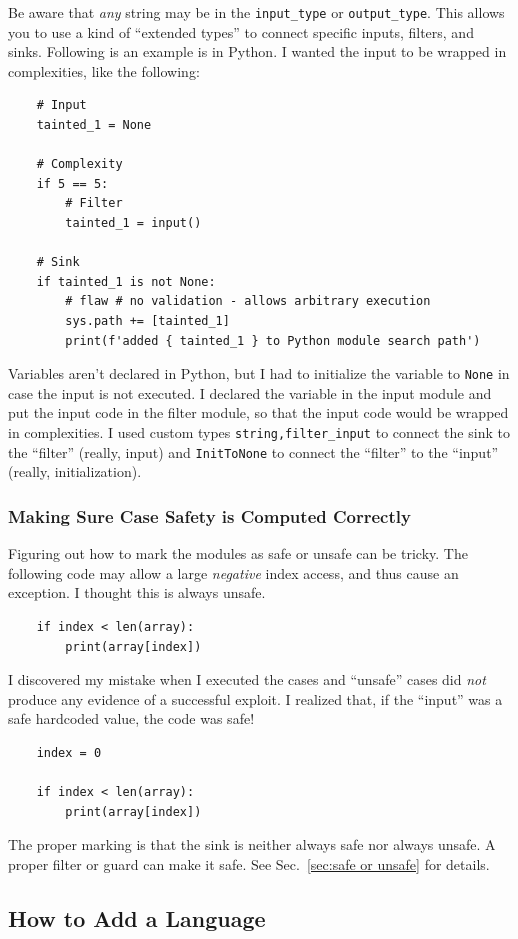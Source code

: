 \documentclass[12pt]{article}
\begin{document}
Be aware that \emph{any} string may be in the \verb|input_type| or
\verb|output_type|.
This allows you to use a kind of ``extended types'' to connect specific inputs,
filters, and sinks.  Following is an example is in Python.
I wanted the input to be wrapped in
complexities, like the following:
\begin{verbatim}
    # Input
    tainted_1 = None

    # Complexity
    if 5 == 5:
        # Filter
        tainted_1 = input()

    # Sink
    if tainted_1 is not None:
        # flaw # no validation - allows arbitrary execution
        sys.path += [tainted_1]
        print(f'added { tainted_1 } to Python module search path')
\end{verbatim}
Variables aren't declared in Python, but I had to initialize the variable to
\verb|None| in case the input is not executed.  I declared the variable in the input
module and put the input code in the filter module, so that the input code would be
wrapped in complexities.  I used custom types \verb|string,filter_input| to connect
the sink to the ``filter'' (really, input) and \verb|InitToNone| to connect the
``filter'' to the ``input'' (really, initialization).

\subsubsection{Making Sure Case Safety is Computed Correctly}

Figuring out how to mark the modules as safe or unsafe can be tricky.
The following code may allow a large \emph{negative} index access, and thus cause an
exception.  I thought this is always unsafe.
\begin{verbatim}
    if index < len(array):
        print(array[index])
\end{verbatim}
I discovered my mistake when I executed the cases and ``unsafe'' cases did
\emph{not} produce any evidence of a successful exploit.  I realized that, if the
``input'' was a safe hardcoded
value, the code was safe!
\begin{verbatim}
    index = 0

    if index < len(array):
        print(array[index])
\end{verbatim}
The proper marking is that the sink is neither always safe nor always unsafe.
A proper filter or guard can make it safe.
See Sec.~\ref{sec:safe or unsafe} for details.


\subsection{How to Add a Language}
\label{sec:add a language}
\end{document}
